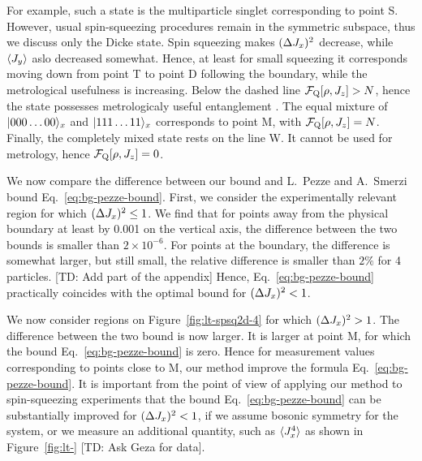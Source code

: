 For example, such a state is the multiparticle singlet corresponding to point S.
However, usual spin-squeezing procedures remain in the symmetric subspace, thus we discuss only the Dicke state.
Spin squeezing makes $(\Delta J_x )^2$ decrease, while $\langle J_y \rangle$ aslo decreased somewhat.
Hence, at least for small squeezing it corresponds moving down from point T to point D following the boundary, while the metrological usefulness is increasing.
Below the dashed line $\mathcal{F}_{\textnormal{Q}}[\rho,J_z]>N$, hence the state possesses metrologicaly useful entanglement \citep{}.
The equal mixture of $\vert 000\dots00 \rangle_x$ and $\vert 111\dots11 \rangle_x$ corresponds to point M, with $\mathcal{F}_{\textnormal{Q}}[\rho,J_z] = N$.
Finally, the completely mixed state rests on the line W.
It cannot be used for metrology, hence $\mathcal{F}_{\textnormal{Q}}[\rho,J_z]=0$.

We now compare the difference between our bound and L.~Pezze and A.~Smerzi bound Eq.~\eqref{eq:bg-pezze-bound}.
First, we consider the experimentally relevant region for which $(\Delta J_x )^2\leq 1$.
We find that for points away from the physical boundary at least by 0.001 on the vertical axis, the difference between the two bounds is smaller than $2\times10^{-6}$.
For points at the boundary, the difference is somewhat larger, but still small, the relative difference is smaller than $2\%$ for 4 particles.
[TD: Add part of the appendix]
Hence, Eq.~\eqref{eq:bg-pezze-bound} practically coincides with the optimal bound for $(\Delta J_x )^2<1$.

We now consider regions on Figure~\ref{fig:lt-spsq2d-4} for which $(\Delta J_x )^2>1$.
The difference between the two bound is now larger.
It is larger at point M, for which the bound Eq.~\eqref{eq:bg-pezze-bound} is zero.
Hence for measurement values corresponding to points close to M, our method improve the formula Eq.~\eqref{eq:bg-pezze-bound}.
It is important from the point of view of applying our method to spin-squeezing experiments that the bound Eq.~\eqref{eq:bg-pezze-bound} can be substantially improved for $(\Delta J_x )^2<1$, if we assume bosonic symmetry for the system, or we measure an additional quantity, such as $\langle J_x^4 \rangle$ as shown in Figure~\ref{fig:lt-} [TD: Ask Geza for data].

